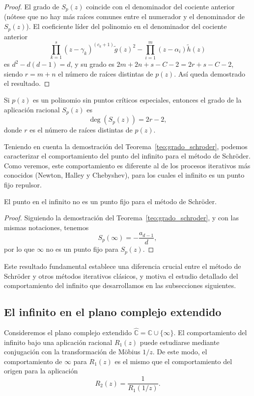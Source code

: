 \begin{proof}
El grado de $S_p(z)$ coincide con el denominador del cociente anterior (nótese que no hay más raíces comunes entre el numerador y el denominador de $S_p(z)$). El coeficiente líder del polinomio en el denominador del cociente anterior
$$
\prod_{k=1}^s(z-\gamma_k)^{(c_k+1)} \tilde{g}(z)^2-\prod_{i=1}^m(z-\alpha_i)\tilde{h}(z)
$$
es $d^2-d(d-1)=d$, y su grado es
$2m+2n+s-C-2 =2r+s-C-2$, siendo $r=m+n$ el número de raíces distintas de $p(z)$. Así queda demostrado el resultado.
\end{proof}

\begin{corolario}\label{cor:grado_sin_criticos}
Si $p(z)$ es un polinomio sin puntos críticos especiales, entonces el grado de la aplicación racional $S_{p}(z)$ es
$$\deg(S_{p}(z))=2r-2,$$
donde $r$ es el número de raíces distintas de $p(z)$.
\end{corolario}

Teniendo en cuenta la demostración del Teorema~\ref{teo:grado_schroder}, podemos caracterizar el comportamiento del punto del infinito para el método de Schröder. Como veremos, este comportamiento es diferente al de los procesos iterativos más conocidos (Newton, Halley y Chebyshev), para los cuales el infinito es un punto fijo repulsor.

\begin{corolario}\label{cor:infinito_no_fijo}
El punto en el infinito no es un punto fijo para el método de Schröder.
\end{corolario}

\begin{proof}
Siguiendo la demostración del Teorema~\ref{teo:grado_schroder}, y con las mismas notaciones, tenemos
$$
S_p(\infty)=-\frac{a_{d-1}}{d},
$$
por lo que $\infty$ no es un punto fijo para $S_p(z)$.
\end{proof}

Este resultado fundamental establece una diferencia crucial entre el método de Schröder y otros métodos iterativos clásicos, y motiva el estudio detallado del comportamiento del infinito que desarrollamos en las subsecciones siguientes.

\subsection{El infinito en el plano complejo extendido}

Consideremos el plano complejo extendido $\hat{\mathbb{C}}=\mathbb{C}\cup\{\infty\}$. El comportamiento del infinito bajo una aplicación racional $R_1(z)$ puede estudiarse mediante conjugación con la transformación de Möbius $1/z$. De este modo, el comportamiento de $\infty$ para $R_1(z)$ es el mismo que el comportamiento del origen para la aplicación
$$
R_2(z)=\frac{1}{R_1(1/z)}.
$$

